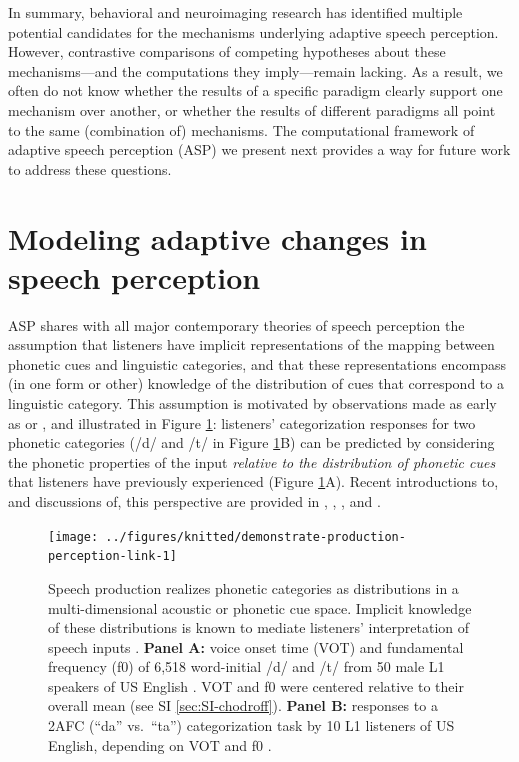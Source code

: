 \documentclass[
  11pt,
  man,floatsintext]{apa6}
\begin{document}
In summary, behavioral and neuroimaging research has identified multiple potential candidates for the mechanisms underlying adaptive speech perception. However, contrastive comparisons of competing hypotheses about these mechanisms---and the computations they imply---remain lacking. As a result, we often do not know whether the results of a specific paradigm clearly support one mechanism over another, or whether the results of different paradigms all point to the same (combination of) mechanisms. The computational framework of adaptive speech perception (ASP) we present next provides a way for future work to address these questions.

\hypertarget{sec:framework}{%
\section{Modeling adaptive changes in speech perception}\label{sec:framework}}

ASP shares with all major contemporary theories of speech perception the assumption that listeners have implicit representations of the mapping between phonetic cues and linguistic categories, and that these representations encompass (in one form or other) knowledge of the distribution of cues that correspond to a linguistic category. This assumption is motivated by observations made as early as \textcite{abramson1973voice} or \textcite{nearey-hogan1986}, and illustrated in Figure \ref{fig:demonstrate-production-perception-link}: listeners' categorization responses for two phonetic categories (/d/ and /t/ in Figure \ref{fig:demonstrate-production-perception-link}B) can be predicted by considering the phonetic properties of the input \emph{relative to the distribution of phonetic cues} that listeners have previously experienced (Figure \ref{fig:demonstrate-production-perception-link}A). Recent introductions to, and discussions of, this perspective are provided in \textcite{bent-baeseberk2021}, \textcite{kurumada-roettger2021}, \textcite{quam-creel2021}, and \textcite{schertz-clare2020}.



\begin{figure}

{\centering \texttt{[image: ../figures/knitted/demonstrate-production-perception-link-1]} 

}

\caption{Speech production realizes phonetic categories as distributions in a multi-dimensional acoustic or phonetic cue space. Implicit knowledge of these distributions is known to mediate listeners' interpretation of speech inputs \autocite[for review, see][]{schertz-clare2020}. \textbf{Panel A:} voice onset time (VOT) and fundamental frequency (f0) of 6,518 word-initial /d/ and /t/ from 50 male L1 speakers of US English \autocite[data from][]{chodroff-wilson2018}. VOT and f0 were centered relative to their overall mean (see SI \ref{sec:SI-chodroff}). \textbf{Panel B:} responses to a 2AFC (``da'' vs.~``ta'') categorization task by 10 L1 listeners of US English, depending on VOT and f0 \autocite[data from Experiment 1 in][]{burchill-jaeger2022}.}\label{fig:demonstrate-production-perception-link}
\end{figure}
\end{document}
